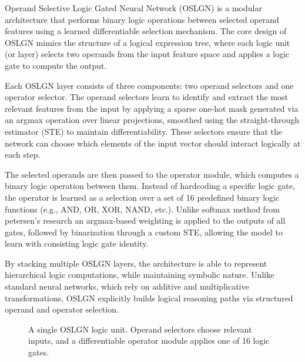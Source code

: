 Operand Selective Logic Gated Neural Network (OSLGN) is a modular architecture that performs binary logic operations between selected operand features using a learned differentiable selection mechanism. The core design of OSLGN mimics the structure of a logical expression tree, where each logic unit (or layer) selects two operands from the input feature space and applies a logic gate to compute the output.

Each OSLGN layer consists of three components: two operand selectors and one operator selector. The operand selectors learn to identify and extract the most relevant features from the input by applying a sparse one-hot mask generated via an argmax operation over linear projections, smoothed using the straight-through estimator (STE) to maintain differentiability. These selectors ensure that the network can choose which elements of the input vector should interact logically at each step.

The selected operands are then passed to the operator module, which computes a binary logic operation between them. Instead of hardcoding a specific logic gate, the operator is learned as a selection over a set of 16 predefined binary logic functions (e.g., AND, OR, XOR, NAND, etc.). Unlike softmax method from petersen's research\cite{petersen2022deep} an argmax-based weighting is applied to the outputs of all gates, followed by binarization through a custom STE, allowing the model to learn with consisting logic gate identity.

By stacking multiple OSLGN layers, the architecture is able to represent hierarchical logic computations, while maintaining symbolic nature. Unlike standard neural networks, which rely on additive and multiplicative transformations, OSLGN explicitly builds logical reasoning paths via structured operand and operator selection.

\begin{figure}[H]
    \centering
    \caption{
    A single OSLGN logic unit. Operand selectors choose relevant inputs, and a differentiable operator module applies one of 16 logic gates.
    }
    \label{fig:oslgn-block}
    \end{figure}
    
